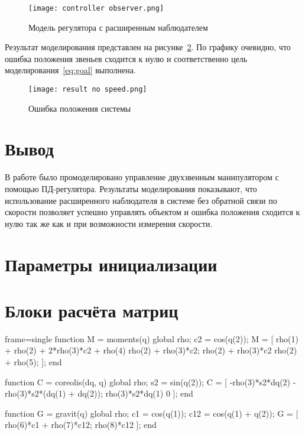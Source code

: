 \documentclass[14pt]{extarticle}
\begin{document}
    \begin{figure}[H]
        \centering
        \texttt{[image: controller observer.png]}
        \caption{Модель регулятора с расширенным наблюдателем}
        \label{pic:controller observer}
    \end{figure}

    Результат моделирования представлен на рисунке~\ref{pic:result no speed}. По графику очевидно, что ошибка
    положения звеньев сходится к нулю и соответственно цель моделирования~\eqref{eq:goal} выполнена.
    \begin{figure}[H]
        \centering
        \texttt{[image: result no speed.png]}
        \caption{Ошибка положения системы}
        \label{pic:result no speed}
    \end{figure}

    \section*{Вывод}
    В работе было промоделировано управление двухзвенным манипулятором с помощью ПД-регулятора.
    Результаты моделирования показывают, что использование расширенного наблюдателя в системе без
    обратной связи по скорости позволяет успешно управлять объектом и ошибка положения сходится
    к нулю так же как и при возможности измерения скорости.

    \appendix \newpage
    \renewcommand{\thesection}{Приложение \Asbuk{section}}
    \section{Параметры инициализации}\label{code:given}

    \newpage
    \section{Блоки расчёта матриц}\label{code:matricies}
    \begin{octavecode*}{frame=single}
        function M = moments(q)
            global rho;
            c2 = cos(q(2));
            M = [
                rho(1) + rho(2) + 2*rho(3)*c2 + rho(4) rho(2) + rho(3)*c2;
                rho(2) + rho(3)*c2 rho(2) + rho(5);
                ];
        end

        function C = coreolis(dq, q)
            global rho;
            s2 = sin(q(2));
            C = [
                -rho(3)*s2*dq(2) -rho(3)*s2*(dq(1) + dq(2));
                rho(3)*s2*dq(1) 0
                ];
        end

        function G = gravit(q)
            global rho;
            c1 = cos(q(1));
            c12 = cos(q(1) + q(2));
            G = [
                rho(6)*c1 + rho(7)*c12;
                rho(8)*c12
                ];
        end
    \end{octavecode*}
\end{document}
